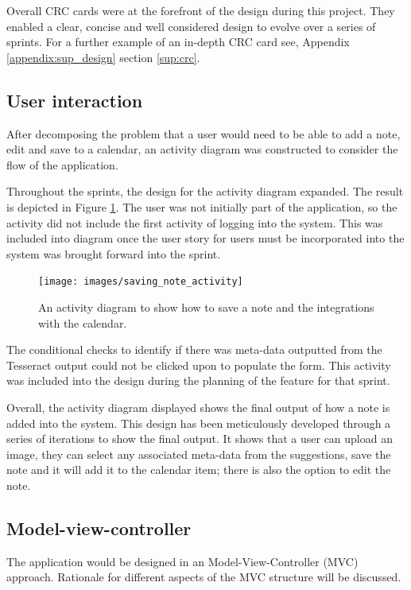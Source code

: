 Overall CRC cards were at the forefront of the design during this project. They enabled a clear, concise and well considered design to evolve over a series of sprints. For a further example of an in-depth CRC card see, Appendix \ref{appendix:sup_design} section \ref{sup:crc}.

\subsection{User interaction}
After decomposing the problem that a user would need to be able to add a note, edit and save to a calendar, an activity diagram was constructed to consider the flow of the application.

Throughout the sprints, the design for the activity diagram expanded. The result is depicted in Figure \ref{fig:activity_show_note}. The user was not initially part of the application, so the activity did not include the first activity of logging into the system. This was included into diagram once the user story for users must be incorporated into the system was brought forward into the sprint.

\begin{figure}[H]
  \centering
  \texttt{[image: images/saving\_note\_activity]}
  \caption{An activity diagram to show how to save a note and the integrations with the calendar.}
  \label{fig:activity_show_note}
\end{figure}

The conditional checks to identify if there was meta-data outputted from the Tesseract output could not be clicked upon to populate the form. This activity was included into the design during the planning of the feature for that sprint.

Overall, the activity diagram displayed shows the final output of how a note is added into the system. This design has been meticulously developed through a series of iterations to show the final output. It shows that a user can upload an image, they can select any associated meta-data from the suggestions, save the note and it will add it to the calendar item; there is also the option to edit the note.

\subsection{Model-view-controller}
The application would be designed in an Model-View-Controller (MVC) approach. Rationale for different aspects of the MVC structure will be discussed.

